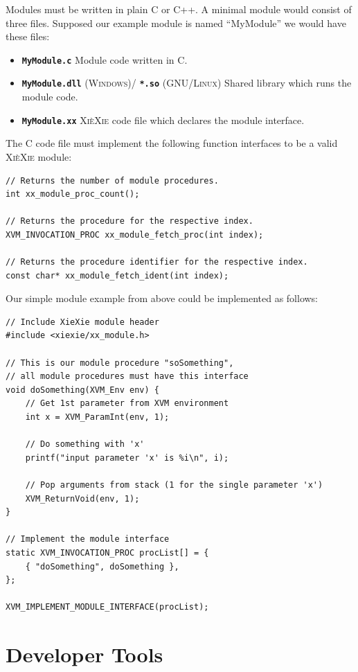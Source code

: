 \documentclass[a5paper]{report}
\def\xiexie{\textsc{Xi\`eXie}\xspace}
\def\cpp{\textsc{C++}\xspace}
\def\windows{\textsc{Windows}\xspace}
\def\linux{\textsc{GNU/Linux}\xspace}
\begin{document}
Modules must be written in plain C or \cpp. A minimal module would consist of three files.
Supposed our example module is named ``MyModule'' we would have these files:
\begin{itemize}
	\item \textbf{\texttt{MyModule.c}}
		Module code written in C.
	\item \textbf{\texttt{MyModule.dll}} (\windows)/ \textbf{\texttt{*.so}} (\linux)
		Shared library which runs the module code.
	\item \textbf{\texttt{MyModule.xx}}
		\xiexie code file which declares the module interface.
\end{itemize}
The C code file must implement the following function interfaces to be a valid \xiexie module:
\begin{lstlisting}
// Returns the number of module procedures.
int xx_module_proc_count();

// Returns the procedure for the respective index.
XVM_INVOCATION_PROC xx_module_fetch_proc(int index);

// Returns the procedure identifier for the respective index.
const char* xx_module_fetch_ident(int index);
\end{lstlisting}
Our simple module example from above could be implemented as follows:
\begin{lstlisting}
// Include XieXie module header
#include <xiexie/xx_module.h>

// This is our module procedure "soSomething",
// all module procedures must have this interface
void doSomething(XVM_Env env) {
    // Get 1st parameter from XVM environment
    int x = XVM_ParamInt(env, 1);
    
    // Do something with 'x'
    printf("input parameter 'x' is %i\n", i);
    
    // Pop arguments from stack (1 for the single parameter 'x')
    XVM_ReturnVoid(env, 1);
}

// Implement the module interface
static XVM_INVOCATION_PROC procList[] = {
    { "doSomething", doSomething },
};

XVM_IMPLEMENT_MODULE_INTERFACE(procList);
\end{lstlisting}



\part{Developer Tools}
\end{document}
